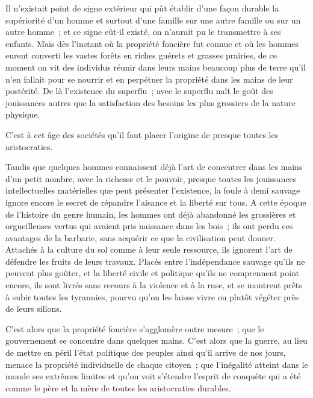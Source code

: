 \documentclass[twoside]{book} %
\begin{document}
\noindent Il n’existait point de signe extérieur qui pût établir d’une façon durable la supériorité d’un homme et surtout d’une famille sur une autre famille ou sur un autre homme ; et ce signe eût-il existé, on n’aurait pu le transmettre à ses enfants. Mais dès l’instant où la propriété foncière fut connue et où les hommes eurent converti les vastes forêts en riches guérets et grasses prairies, de ce moment on vit des individus réunir dans leurs mains beaucoup plus de terre qu’il n’en fallait pour se nourrir et en perpétuer la propriété dans les mains de leur postérité. De là l’existence du superflu ; avec le superflu naît le goût des jouissances autres que la satisfaction des besoins les plus grossiers de la nature physique.\par
C'est à cet âge des sociétés qu’il faut placer l’origine de presque toutes les aristocraties.\par
Tandis que quelques hommes connaissent déjà l’art de concentrer dans les mains d’un petit nombre, avec la richesse et le pouvoir, presque toutes les jouissances intellectuelles matérielles que peut présenter l’existence, la foule à demi sauvage ignore encore le secret de répandre l’aisance et la liberté sur tous. A cette époque de l’histoire du genre humain, les hommes ont déjà abandonné les grossières et orgueilleuses vertus qui avaient pris naissance dans les bois ; ils ont perdu ces avantages de la barbarie, sans acquérir ce que la civilisation peut donner. Attachés à la culture du sol comme à leur seule ressource, ils ignorent l’art de défendre les fruits de leurs travaux. Placés entre l’indépendance sauvage qu’ils ne peuvent plus goûter, et la liberté civile et politique qu’ils ne comprennent point encore, ils sont livrés sans recours à la violence et à la ruse, et se montrent prêts à subir toutes les tyrannies, pourvu qu’on les laisse vivre ou plutôt végéter près de leurs sillons.\par
C'est alors que la propriété foncière s’agglomère outre mesure ; que le gouvernement se concentre dans quelques mains. C'est alors que la guerre, au lieu de mettre en péril l’état politique des peuples ainsi qu’il arrive de nos jours, menace la propriété individuelle de chaque citoyen ; que l’inégalité atteint dans le monde ses extrêmes limites et qu’on voit s’étendre l’esprit de conquête qui a été comme le père et la mère de toutes les aristocraties durables.\par
\end{document}
